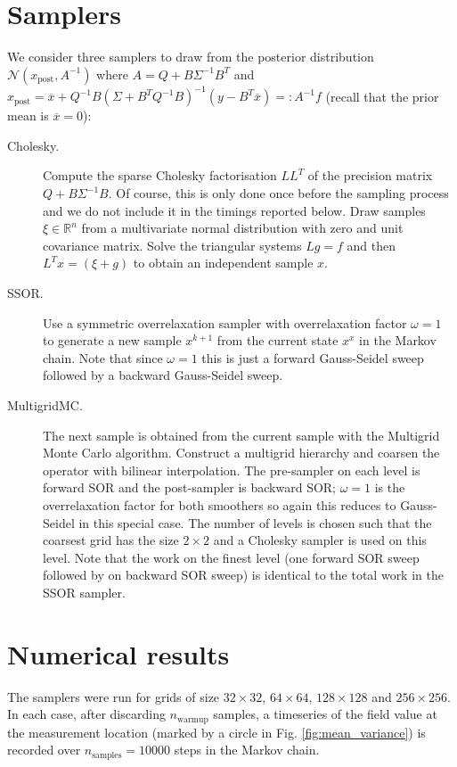 \documentclass[11pt]{article}
\begin{document}
\section{Samplers}
We consider three samplers to draw from the posterior distribution $\mathcal{N}(x_{\text{post}},A^{-1})$ where $A = Q + B\Sigma^{-1}B^T$ and $x_{\text{post}} = \overline{x} + Q^{-1}B(\Sigma + B^T Q^{-1}B)^{-1}(y-B^T\overline{x})=:A^{-1}f$ (recall that the prior mean is $\overline{x}=0$):
\begin{description}
    \item[Cholesky.] Compute the sparse Cholesky factorisation $LL^T$ of the precision matrix $Q+B\Sigma^{-1}B$. Of course, this is only done once before the sampling process and we do not include it in the timings reported below. Draw samples $\xi\in\mathbb{R}^n$ from a multivariate normal distribution with zero and unit covariance matrix. Solve the triangular systems $Lg = f$ and then $L^T x = (\xi + g)$ to obtain an independent sample $x$.
    \item[SSOR.] Use a symmetric overrelaxation sampler with overrelaxation factor $\omega=1$ to generate a new sample $x^{k+1}$ from the current state $x^x$ in the Markov chain. Note that since $\omega=1$ this is just a forward Gauss-Seidel sweep followed by a backward Gauss-Seidel sweep.
    \item[MultigridMC.] The next sample is obtained from the current sample with the Multigrid Monte Carlo algorithm. Construct a multigrid hierarchy and coarsen the operator with bilinear interpolation. The pre-sampler on each level is forward SOR and the post-sampler is backward SOR; $\omega=1$ is the overrelaxation factor for both smoothers so again this reduces to Gauss-Seidel in this special case. The number of levels is chosen such that the coarsest grid has the size $2\times 2$ and a Cholesky sampler is used on this level. Note that the work on the finest level (one forward SOR sweep followed by on backward SOR sweep) is identical to the total work in the SSOR sampler.
\end{description}
\section{Numerical results}
The samplers were run for grids of size $32\times 32$, $64\times 64$, $128\times 128$ and $256\times 256$. In each case, after discarding $n_{\text{warmup}}$ samples, a timeseries of the field value at the measurement location (marked by a circle in Fig. \ref{fig:mean_variance}) is recorded over $n_{\text{samples}}=10000$ steps in the Markov chain.
\end{document}
